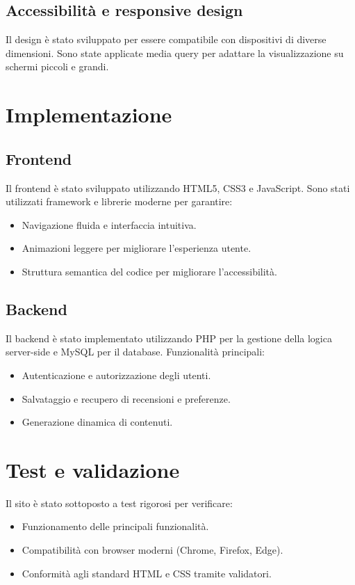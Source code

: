 \documentclass[a4paper, 12pt]{article}
\begin{document}
\begin{justify}
\subsection{Accessibilit\`a e responsive design}
Il design \`e stato sviluppato per essere compatibile con dispositivi di diverse dimensioni. Sono state applicate media query per adattare la visualizzazione su schermi piccoli e grandi.

\section{Implementazione}
\subsection{Frontend}
Il frontend \`e stato sviluppato utilizzando HTML5, CSS3 e JavaScript. Sono stati utilizzati framework e librerie moderne per garantire:
\begin{itemize}
    \item Navigazione fluida e interfaccia intuitiva.
    \item Animazioni leggere per migliorare l'esperienza utente.
    \item Struttura semantica del codice per migliorare l'accessibilit\`a.
\end{itemize}

\subsection{Backend}
Il backend \`e stato implementato utilizzando PHP per la gestione della logica server-side e MySQL per il database. Funzionalit\`a principali:
\begin{itemize}
    \item Autenticazione e autorizzazione degli utenti.
    \item Salvataggio e recupero di recensioni e preferenze.
    \item Generazione dinamica di contenuti.
\end{itemize}

\section{Test e validazione}
Il sito \`e stato sottoposto a test rigorosi per verificare:
\begin{itemize}
    \item Funzionamento delle principali funzionalit\`a.
    \item Compatibilit\`a con browser moderni (Chrome, Firefox, Edge).
    \item Conformit\`a agli standard HTML e CSS tramite validatori.
\end{itemize}


\end{justify}
\end{document}
